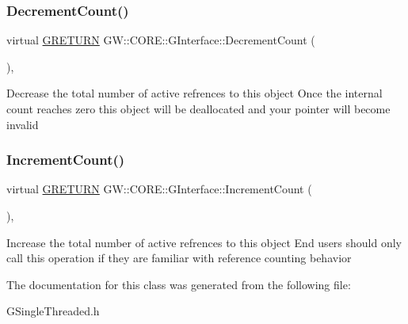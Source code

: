 \subsubsection{\texorpdfstring{Decrement\+Count()}{DecrementCount()}}
{\footnotesize\ttfamily virtual \hyperlink{namespace_g_w_a69b1aaebac1cac8049825f035884c95b}{G\+R\+E\+T\+U\+RN} G\+W\+::\+C\+O\+R\+E\+::\+G\+Interface\+::\+Decrement\+Count (\begin{DoxyParamCaption}{ }\end{DoxyParamCaption})\hspace{0.3cm}{\ttfamily [pure virtual]}, {\ttfamily [inherited]}}

Decrease the total number of active refrences to this object Once the internal count reaches zero this object will be deallocated and your pointer will become invalid \hypertarget{class_g_w_1_1_c_o_r_e_1_1_g_interface_a3e04e58eef4f3e3f56ff7fb751194c37}{}\label{class_g_w_1_1_c_o_r_e_1_1_g_interface_a3e04e58eef4f3e3f56ff7fb751194c37} 
\subsubsection{\texorpdfstring{Increment\+Count()}{IncrementCount()}}
{\footnotesize\ttfamily virtual \hyperlink{namespace_g_w_a69b1aaebac1cac8049825f035884c95b}{G\+R\+E\+T\+U\+RN} G\+W\+::\+C\+O\+R\+E\+::\+G\+Interface\+::\+Increment\+Count (\begin{DoxyParamCaption}{ }\end{DoxyParamCaption})\hspace{0.3cm}{\ttfamily [pure virtual]}, {\ttfamily [inherited]}}

Increase the total number of active refrences to this object End users should only call this operation if they are familiar with reference counting behavior 

The documentation for this class was generated from the following file\+:\begin{DoxyCompactItemize}
\item 
G\+Single\+Threaded.\+h\end{DoxyCompactItemize}

